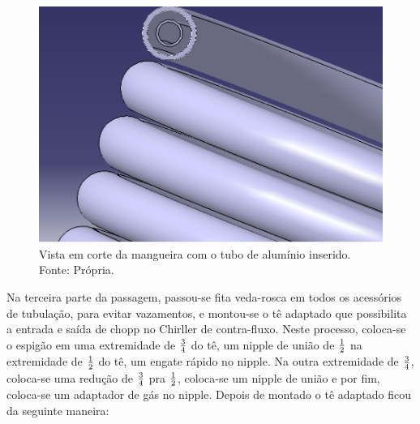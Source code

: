                         \begin{figure}[!htb]
                            \centering
                            \includegraphics[scale= 0.3]{figuras/corte-mangeira.png}
                            \caption{Vista em corte da mangueira com o tubo de alumínio inserido. Fonte: Própria.}
                            \label{vista-mangueira}
                        \end{figure}

                        Na terceira parte da passagem, passou-se fita veda-rosca em todos os acessórios de
                        tubulação, para evitar vazamentos, e montou-se o tê adaptado que possibilita a
                        entrada e saída de chopp no Chirller de contra-fluxo. Neste processo,
                        coloca-se o espigão em uma extremidade de $3 \over 4$ do tê, um nipple de união
                        de $1 \over 2$ na extremidade de $1 \over 2$ do tê, um engate rápido no nipple. Na outra
                        extremidade de $3 \over 4$, coloca-se uma redução de $3 \over 4$ pra $1 \over 2$, coloca-se
                        um nipple de união e por fim, coloca-se um adaptador de gás no nipple. Depois
                        de montado o tê adaptado ficou da seguinte maneira:

